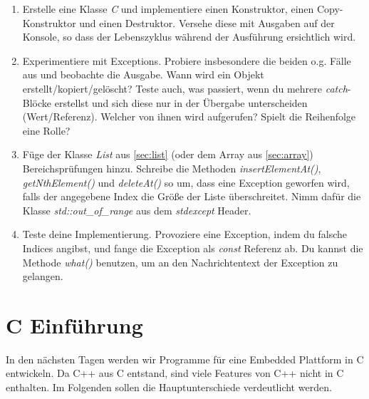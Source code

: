 \begin{enumerate}
\item 
Erstelle eine Klasse \emph{C} und implementiere einen Konstruktor, einen Copy-Konstruktor und einen Destruktor.
Versehe diese mit Ausgaben auf der Konsole, so dass der Lebenszyklus während der Ausführung ersichtlich wird.

\item 
Experimentiere mit Exceptions.
Probiere insbesondere die beiden o.g. Fälle aus und beobachte die Ausgabe. 
Wann wird ein Objekt erstellt/kopiert/gelöscht? 
Teste auch, was passiert, wenn du mehrere \emph{catch}-Blöcke erstellst und sich diese nur in der Übergabe unterscheiden (Wert/Referenz). Welcher von ihnen wird aufgerufen?
Spielt die Reihenfolge eine Rolle?

\item
Füge der Klasse \emph{List} aus \ref{sec:list} (oder dem Array aus \ref{sec:array}) Bereichsprüfungen hinzu.
Schreibe die Methoden \emph{insertElementAt()}, \emph{getNthElement()} und \emph{deleteAt()} so um, dass eine Exception geworfen wird, falls der angegebene Index die Größe der Liste überschreitet. 
Nimm dafür die Klasse \emph{std::out\_of\_range} aus dem \emph{stdexcept} Header.

\item
Teste deine Implementierung.
Provoziere eine Exception, indem du falsche Indices angibst, und fange die Exception als \emph{const} Referenz ab. Du kannst die Methode \emph{what()} benutzen, um an den Nachrichtentext der Exception zu gelangen.

\end{enumerate}


\section{C Einführung}
In den nächsten Tagen werden wir Programme für eine Embedded Plattform in C entwickeln. 
Da C++ aus C entstand, sind viele Features von C++ nicht in C enthalten. Im Folgenden sollen die Hauptunterschiede verdeutlicht werden.

